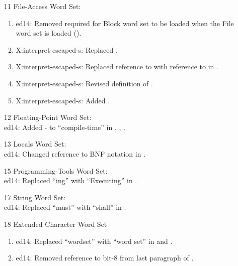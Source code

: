 \begin{itemize}
	\item[11] File-Access Word Set:				%
		\begin{enumerate}
		\item \textsf{ed14}: Removed required for Block word set to be
			loaded when the File word set is loaded ().
		\item \textsf{X:interpret-escaped-s}: Replaced .
		\item \textsf{X:interpret-escaped-s}: Replaced reference to  with
			reference to  in .
		\item \textsf{X:interpret-escaped-s}: Revised definition of .
		\item \textsf{X:interpret-escaped-s}: Added .
		\end{enumerate}

	\item[12] Floating-Point Word Set:				%
		~\\
		\textsf{ed14}: Added - to ``compile-time'' in
			,
			,
			.

	\item[13] Locals Word Set:						%
		~\\ \textsf{ed14}: Changed reference to BNF notation in .

	\item[15] Programming-Tools Word Set:			%
		~\\	\textsf{ed14}: Replaced ``ing'' with ``Executing''
			in .

	\item[17] String Word Set:						%
		~\\ \textsf{ed14}: Replaced ``must'' with ``shall'' in .

	\item[18] Extended Character Word Set			%
		\begin{enumerate}
		\item \textsf{ed14}: Replaced ``wordset'' with ``word set'' in 
			and .
		\item \textsf{ed14}: Removed reference to bit-8 from last paragraph of
			.
		\end{enumerate}
		

\end{itemize}
